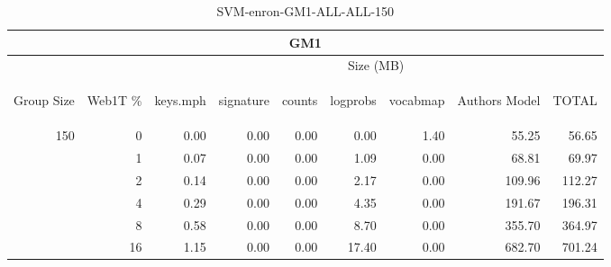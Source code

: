\begin{center}
\begin{table}[htbp] 
 \begin{center}
\begin{tabular}{ | r | r | r | r | r | r | r | r | r |}
\hline
\multicolumn{9}{|c|}{GM1}\\
\hline
 & & \multicolumn{7}{|c|}{Size (MB)}\\ \cline{3-9}
\begin{sideways}Group Size\end{sideways} & \begin{sideways}Web1T \% \end{sideways} & \begin{sideways}keys.mph\end{sideways} & \begin{sideways}signature\end{sideways} & \begin{sideways}counts\end{sideways} & \begin{sideways}logprobs\end{sideways} & \begin{sideways}vocabmap\end{sideways} & \begin{sideways}Authors Model \end{sideways} & \begin{sideways}TOTAL\end{sideways}\\
\hline
\multirow{5}{*}{150}
 & 0 & 0.00 & 0.00 & 0.00 & 0.00 & 1.40 & 55.25 & 56.65\\ \cline{2-9}
 & 1 & 0.07 & 0.00 & 0.00 & 1.09 & 0.00 & 68.81 & 69.97\\ \cline{2-9}
 & 2 & 0.14 & 0.00 & 0.00 & 2.17 & 0.00 & 109.96 & 112.27\\ \cline{2-9}
 & 4 & 0.29 & 0.00 & 0.00 & 4.35 & 0.00 & 191.67 & 196.31\\ \cline{2-9}
 & 8 & 0.58 & 0.00 & 0.00 & 8.70 & 0.00 & 355.70 & 364.97\\ \cline{2-9}
 & 16 & 1.15 & 0.00 & 0.00 & 17.40 & 0.00 & 682.70 & 701.24\\ \cline{2-9}
\hline
\end{tabular}
\caption{SVM-enron-GM1-ALL-ALL-150}
\label{table:SVM-enron-GM1-ALL-ALL-150}
\end{center}
 \end{table}
\end{center}

